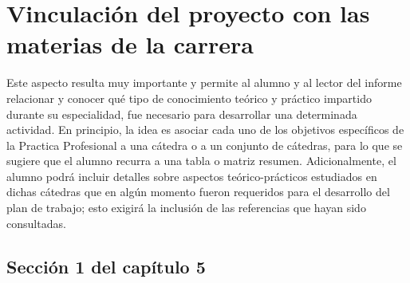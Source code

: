 
\chapter{Vinculación del proyecto con las materias de la carrera} %
\label{Chapter5} %

Este aspecto resulta muy importante y permite al alumno y al lector del informe relacionar y conocer qué tipo de conocimiento teórico y práctico impartido durante su especialidad, fue necesario para desarrollar una determinada actividad. En principio, la idea es asociar cada uno de los objetivos específicos de la Practica Profesional a una cátedra o a un conjunto de cátedras, para lo que se sugiere que el alumno recurra a una tabla o matriz resumen. Adicionalmente, el alumno podrá incluir detalles sobre aspectos teórico-prácticos estudiados en dichas cátedras que en algún momento fueron requeridos para el desarrollo del plan de trabajo; esto exigirá la inclusión de las referencias que hayan sido consultadas.

\section{Sección 1 del capítulo 5}